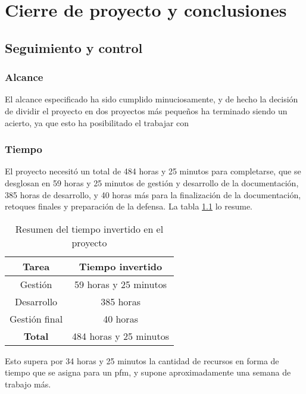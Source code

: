 \chapter{Cierre de proyecto y conclusiones}

\section{Seguimiento y control}
\subsection{Alcance}
El alcance especificado ha sido cumplido minuciosamente, y de hecho la
decisión de dividir el proyecto en dos proyectos más pequeños ha terminado
siendo un acierto, ya que esto ha posibilitado el trabajar con 

\subsection{Tiempo}
El proyecto necesitó un total de 484 horas y 25 minutos para completarse, que
se desglosan en 59 horas y 25 minutos de gestión y desarrollo de la
documentación, 385 horas de desarrollo, y 40 horas más para la finalización de
la documentación, retoques finales y preparación de la defensa. La tabla
\ref{table:summary} lo resume.

\begin{table}[h]
\centering
\begin{tabular}{c|c}
\multicolumn{1}{c|}{\textbf{Tarea}} & \textbf{Tiempo invertido} \\ \hline
Gestión & 59 horas y 25 minutos \\ \hline
Desarrollo & 385 horas \\ \hline
Gestión final & 40 horas \\ \hline
\multicolumn{1}{c|}{\textbf{Total}} & 484 horas y 25 minutos
\end{tabular}
\caption{Resumen del tiempo invertido en el proyecto \label{table:summary}}
\end{table}

Esto supera por 34 horas y 25 minutos la cantidad de recursos en forma de
tiempo que se asigna para un \gls{pfm}, y supone aproximadamente una semana
de trabajo más.

